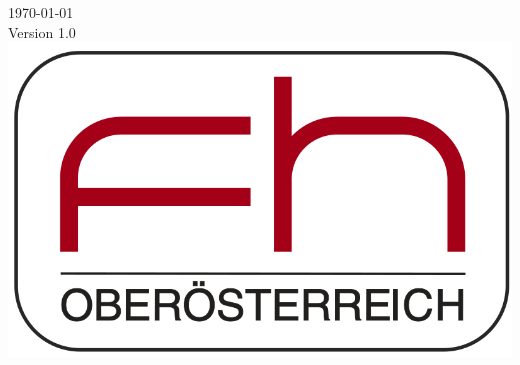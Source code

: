 \documentclass[12pt, letterpaper]{article}
\begin{document}
\begin{titlepage}


{\large \today}\\[1cm] %
{Version 1.0}\\[2cm]

\includegraphics[scale=0.25]{logo.png}
 

\vfill %

\end{titlepage}


\tableofcontents




\end{document}
